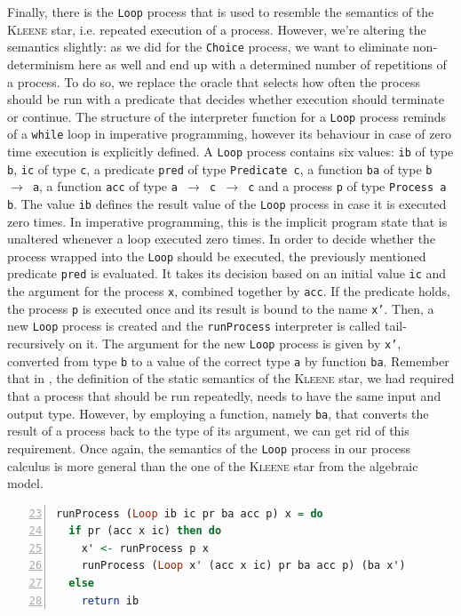 Finally, there is the \texttt{Loop} process that is used to resemble the semantics of the \textsc{Kleene} star, i.e. repeated execution of a process. However, we're altering the semantics slightly: as we did for the \texttt{Choice} process, we want to eliminate non-determinism here as well and end up with a determined number of repetitions of a process. To do so, we replace the oracle that selects how often the process should be run with a predicate that decides whether execution should terminate or continue. The structure of the interpreter function for a \texttt{Loop} process reminds of a \texttt{while} loop in imperative programming, however its behaviour in case of zero time execution is explicitly defined. A \texttt{Loop} process contains six values: \texttt{ib} of type \texttt{b}, \texttt{ic} of type \texttt{c}, a predicate \texttt{pred} of type \texttt{Predicate c}, a function \texttt{ba} of type \texttt{b $\to$ a}, a function \texttt{acc} of type \texttt{a $\to$ c $\to$ c} and a process \texttt{p} of type \texttt{Process a b}. The value \texttt{ib} defines the result value of the \texttt{Loop} process in case it is executed zero times. In imperative programming, this is the implicit program state that is unaltered whenever a loop executed zero times. In order to decide whether the process wrapped into the \texttt{Loop} should be executed, the previously mentioned predicate \texttt{pred} is evaluated. It takes its decision based on an initial value \texttt{ic} and the argument for the process \texttt{x}, combined together by \texttt{acc}. If the predicate holds, the process \texttt{p} is executed once and its result is bound to the name \texttt{x'}. Then, a new \texttt{Loop} process is created and the \texttt{runProcess} interpreter is called tail-recursively on it. The argument for the new \texttt{Loop} process is given by \texttt{x'}, converted from type \texttt{b} to a value of the correct type \texttt{a} by function \texttt{ba}. Remember that in , the definition of the static semantics of the \textsc{Kleene} star, we had required that a process that should be run repeatedly, needs to have the same input and output type. However, by employing a function, namely \texttt{ba}, that converts the result of a process back to the type of its argument, we can get rid of this requirement. Once again, the semantics of the \texttt{Loop} process in our process calculus is more general than the one of the \textsc{Kleene} star from the algebraic model.
\begin{lstlisting}[language=Haskell,caption=Implementation of the interpreter for \texttt{Loop} processes.,numbers=left,frame=bt,firstnumber=23]
runProcess (Loop ib ic pr ba acc p) x = do
  if pr (acc x ic) then do
    x' <- runProcess p x
    runProcess (Loop x' (acc x ic) pr ba acc p) (ba x')
  else
    return ib
\end{lstlisting}


